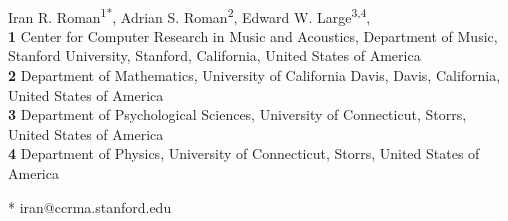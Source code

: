 \documentclass[10pt,letterpaper]{article}
\begin{document}
\vspace*{0.2in}

\begin{flushleft}
{\Large
\textbf{} %
}
\newline
\\
Iran R. Roman\textsuperscript{1*},
Adrian S. Roman\textsuperscript{2},
Edward W. Large\textsuperscript{3,4},
\\
\bigskip
\textbf{1} Center for Computer Research in Music and Acoustics, Department of Music, Stanford University, Stanford, California, United States of America
\\
\textbf{2} Department of Mathematics, University of California Davis, Davis, California, United States of America
\\
\textbf{3} Department of Psychological Sciences, University of Connecticut, Storrs, United States of America
\\
\textbf{4} Department of Physics, University of Connecticut, Storrs, United States of America  
\\
\bigskip

% 

* iran@ccrma.stanford.edu

\end{flushleft}
\end{document}
